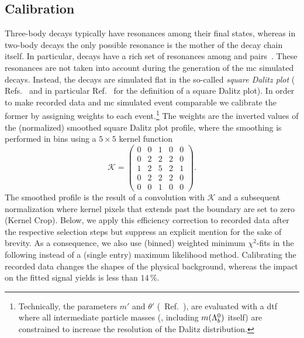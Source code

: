 \subsection{Calibration}
\label{sec:norm_calibration}
Three-body decays typically have resonances among their final states, whereas in two-body decays the only possible resonance is the mother of the decay chain itself.
In particular, \decay{\Lb}{\Dz\proton\pim} decays have a rich set of resonances among \Dz\proton and \Dz\pim pairs~\cite{LbToDzphAndLch}.
These resonances are not taken into account during the generation of the \gls{mc} simulated decays.
Instead, the decays are simulated flat in the so-called \textit{square Dalitz plot} (\cf{} Refs.~\cite{dalitz1,dalitz2} and in particular Ref.~\cite{BsToDKpi} for the definition of a square Dalitz plot).
In order to make recorded data and \gls{mc} simulated event comparable we calibrate the former by assigning weights to each event.\footnote{Technically, the parameters $m'$ and $\theta'$ (\cf{}~Ref.~\cite{BsToDKpi}), are evaluated with a \Gls{dtf} where all intermediate particle masses (\ie{}, including $m({{\Lambda}^0_{b}})$ itself) are constrained to increase the resolution of the Dalitz distribution.}
The weights are the inverted values of the (normalized) smoothed square Dalitz plot profile, where the smoothing is performed in bins using a $5 \times 5$ kernel function
\begin{equation*}
    \mathcal{K} = \begin{pmatrix}
        0 & 0 & 1 & 0 & 0 \\
        0 & 2 & 2 & 2 & 0 \\
        1 & 2 & 5 & 2 & 1 \\
        0 & 2 & 2 & 2 & 0 \\
        0 & 0 & 1 & 0 & 0
    \end{pmatrix}.
\end{equation*}
The smoothed profile is the result of a convolution with $\mathcal{K}$ and a subsequent normalization where kernel pixels that extends past the boundary are set to zero (Kernel Crop).
Below, we apply this efficiency correction to recorded data after the respective selection steps but suppress an explicit mention for the sake of brevity.
As a consequence, we also use (binned) weighted minimum $\chi^2$-fits in the following instead of a (single entry) maximum likelihood method.
Calibrating the recorded data changes the shapes of the physical background, whereas the impact on the fitted signal yields is less than $14\,\%$.

